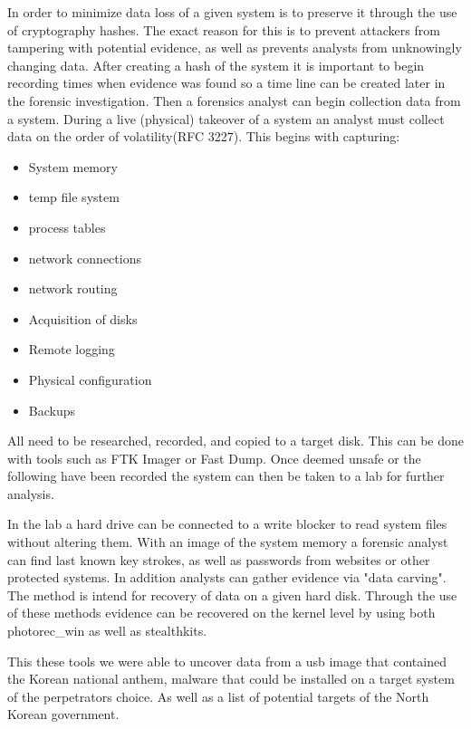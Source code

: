 \documentclass[letterpaper,12pt,titlepage,onecolumn]{IEEEtran}
\begin{document}
In order to minimize data loss of a given system is to preserve it through the use of cryptography hashes. The exact reason for this is to prevent attackers from tampering with potential evidence, as well as prevents analysts from unknowingly changing data. After creating a hash of the system it is important to begin recording times when evidence was found so a time line can be created later in the forensic investigation. Then a forensics analyst can begin collection data from a system. During a live (physical) takeover of a system an analyst must collect data on the order of volatility(RFC 3227). This begins with capturing: 
\begin{itemize}
    \item System memory
    \item temp file system
    \item process tables
    \item network connections
    \item network routing
    \item Acquisition of disks
    \item Remote logging
    \item Physical configuration
    \item Backups
\end{itemize}

All need to be researched, recorded, and copied to a target disk. This can be done with tools such as FTK Imager or Fast Dump. Once deemed unsafe or the following have been recorded the system can then be taken to a lab for further analysis.\par

In the lab a hard drive can be connected to a write blocker to read system files without altering them. With an image of the system memory a forensic analyst can find last known key strokes, as well as passwords from websites or other protected systems. In addition analysts can gather evidence via "data carving". The method is intend for recovery of data on a given hard disk. Through the use of these methods evidence can be recovered on the kernel level by using both photorec\_win as well as stealthkits. \par

This these tools we were able to uncover data from a usb image that contained the Korean national anthem, malware that could be installed on a target system of the perpetrators choice. As well as a list of potential targets of the North Korean government.




%
%
\end{document}
